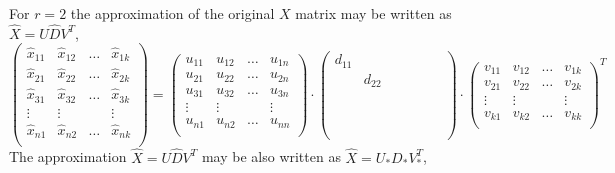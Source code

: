 \documentclass[12pt]{article}
\begin{document}
For $r = 2$ the approximation of the original $X$ matrix may be written as $\hat X = U \hat D V^T$,
\[
\begin{pmatrix}
    \hat x_{11} & \hat x_{12} & \dots & \hat x_{1k} \\
    \hat x_{21} & \hat x_{22} & \dots & \hat x_{2k} \\
    \hat x_{31} & \hat x_{32} & \dots & \hat x_{3k} \\
    \vdots & \vdots &    & \vdots \\
    \hat x_{n1} & \hat x_{n2} & \dots & \hat x_{nk} \\
\end{pmatrix} =
\begin{pmatrix}
    u_{11} & u_{12} & \dots & u_{1n} \\
    u_{21} & u_{22} & \dots & u_{2n} \\
    u_{31} & u_{32} & \dots & u_{3n} \\
    \vdots & \vdots &    & \vdots \\
    u_{n1} & u_{n2} & \dots & u_{nn} \\
\end{pmatrix} \cdot 
\begin{pmatrix}
    d_{11} &  &     &  \\
     & d_{22} &     &  \\
     &  &  \phantom{d_{33}} & \phantom{d_{33}}  \\
     &  &   &     \\
     &  &  &     \\
     &  &  &    \\
     &  &  &     \\
\end{pmatrix} \cdot
\begin{pmatrix}
    v_{11} & v_{12} & \dots & v_{1k} \\
    v_{21} & v_{22} & \dots & v_{2k} \\
    \vdots & \vdots &    & \vdots \\
    v_{k1} & v_{k2} & \dots & v_{kk} \\
\end{pmatrix}^T
\]
The approximation $\hat X = U\hat D V^T$ may be also written as $\hat X = U_* D_* V_*^T$,
\end{document}
